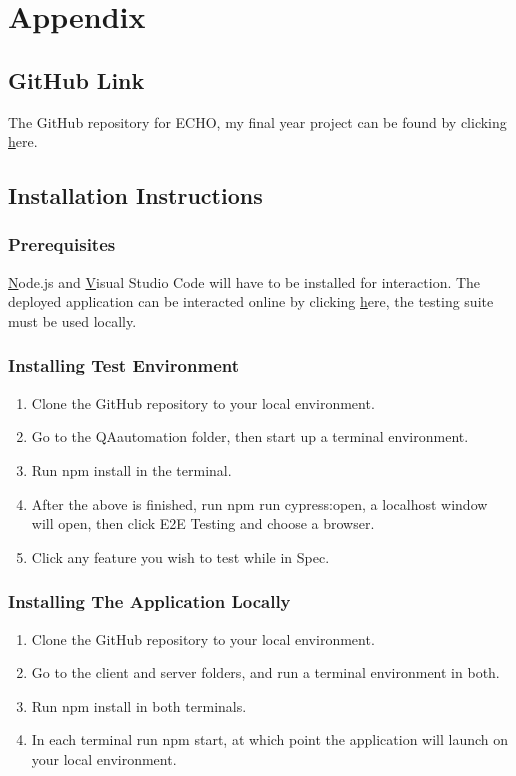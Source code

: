 \chapter{Appendix}
\section{GitHub Link}
The GitHub repository for ECHO, my final year project can be found by clicking \href{https://github.com/Rshocks/Final-Year-Project}here.

\section{Installation Instructions}

\subsection{Prerequisites}
\href{https://nodejs.org/en/download}Node.js and \href{https://code.visualstudio.com/download}Visual Studio Code  will have to be installed for interaction. The deployed application can be interacted online by clicking \href{https://echoatu.com/posts}here, the testing suite must be used locally.

\subsection{Installing Test Environment}
\begin{enumerate}
\item Clone the GitHub repository to your local environment.
\item Go to the QAautomation folder, then start up a terminal environment.
\item Run npm install in the terminal.
\item After the above is finished, run npm run cypress:open, a localhost window will open, then click E2E Testing and choose a browser.
\item Click any feature you wish to test while in Spec.
\end{enumerate}

\subsection{Installing The Application Locally}
\begin{enumerate}
\item Clone the GitHub repository to your local environment.
\item Go to the client and server folders, and run a terminal environment in both.
\item Run npm install in both terminals.
\item In each terminal run npm start, at which point the application will launch on your local environment.
\end{enumerate}